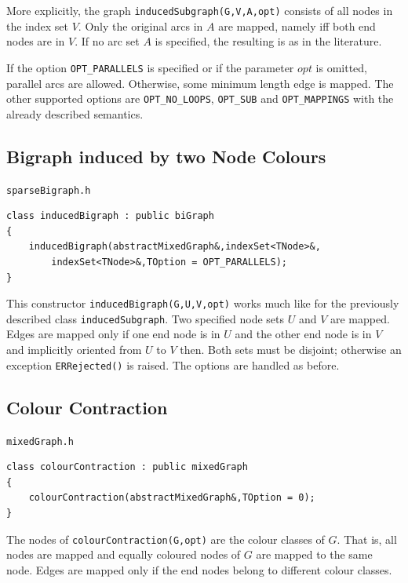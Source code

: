 \documentclass[a4paper,11pt,twoside]{book}
\begin{document}
\begin{multicols}{2}
More explicitly, the graph \verb/inducedSubgraph(G,V,A,opt)/ consists of all
nodes in the index set $V$. Only the original arcs in $A$ are mapped, namely
iff both end nodes are in $V$. If no arc set $A$ is specified, the resulting
 is as in the literature.

If the option \verb/OPT_PARALLELS/ is specified or if the parameter $opt$ is
omitted, parallel arcs are allowed. Otherwise, some minimum length edge is
mapped. The other supported options are \verb/OPT_NO_LOOPS/, \verb/OPT_SUB/
and \verb/OPT_MAPPINGS/ with the already described semantics.


\subsection{Bigraph induced by two Node Colours}
\label{sbl_induced_bigraph}
\myinclude\verb/sparseBigraph.h/
\begin{mymethods}
\begin{verbatim}
class inducedBigraph : public biGraph
{
    inducedBigraph(abstractMixedGraph&,indexSet<TNode>&,
        indexSet<TNode>&,TOption = OPT_PARALLELS);
}
\end{verbatim}
\end{mymethods}
This constructor \verb/inducedBigraph(G,U,V,opt)/ works much like for the
previously described class \verb/inducedSubgraph/. Two specified node sets
$U$ and $V$ are mapped. Edges are mapped only if one end node is in $U$
and the other end node is in $V$ and implicitly oriented from $U$ to $V$ then.
Both sets must be disjoint; otherwise an exception \verb/ERRejected()/ is
raised. The options are handled as before.


\subsection{Colour Contraction}
\label{sbl_colour_contraction}
\myinclude\verb/mixedGraph.h/
\begin{mymethods}
\begin{verbatim}
class colourContraction : public mixedGraph
{
    colourContraction(abstractMixedGraph&,TOption = 0);
}
\end{verbatim}
\end{mymethods}
The nodes of \verb/colourContraction(G,opt)/ are the colour classes of $G$.
That is, all nodes are mapped and equally coloured nodes of $G$ are mapped to
the same node. Edges are mapped only if the end nodes belong to different
colour classes.


\end{multicols}
\end{document}
